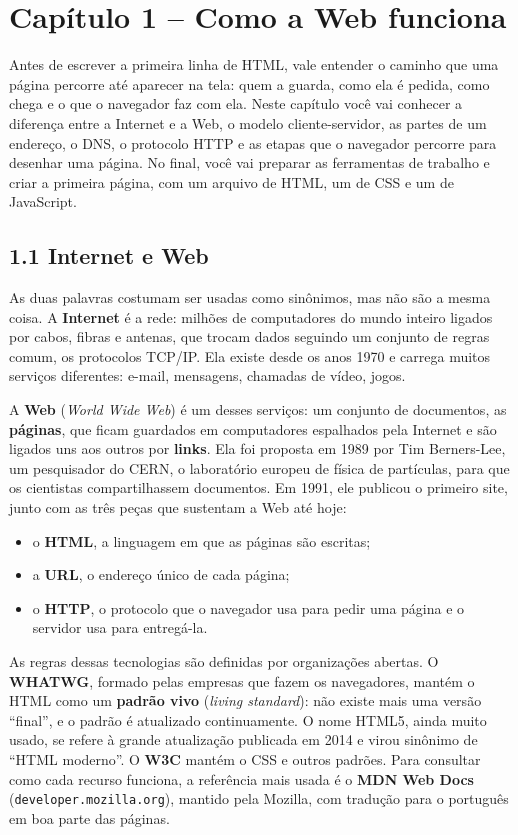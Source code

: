 \section{Capítulo 1 -- Como a Web funciona}

Antes de escrever a primeira linha de HTML, vale entender o caminho que uma página percorre até aparecer na tela: quem a guarda, como ela é pedida, como chega e o que o navegador faz com ela. Neste capítulo você vai conhecer a diferença entre a Internet e a Web, o modelo cliente-servidor, as partes de um endereço, o DNS, o protocolo HTTP e as etapas que o navegador percorre para desenhar uma página. No final, você vai preparar as ferramentas de trabalho e criar a primeira página, com um arquivo de HTML, um de CSS e um de JavaScript.

\subsection{1.1 Internet e Web}

As duas palavras costumam ser usadas como sinônimos, mas não são a mesma coisa. A \textbf{Internet} é a rede: milhões de computadores do mundo inteiro ligados por cabos, fibras e antenas, que trocam dados seguindo um conjunto de regras comum, os protocolos TCP/IP. Ela existe desde os anos 1970 e carrega muitos serviços diferentes: e-mail, mensagens, chamadas de vídeo, jogos.

A \textbf{Web} (\textit{World Wide Web}) é um desses serviços: um conjunto de documentos, as \textbf{páginas}, que ficam guardados em computadores espalhados pela Internet e são ligados uns aos outros por \textbf{links}. Ela foi proposta em 1989 por Tim Berners-Lee, um pesquisador do CERN, o laboratório europeu de física de partículas, para que os cientistas compartilhassem documentos. Em 1991, ele publicou o primeiro site, junto com as três peças que sustentam a Web até hoje:

\begin{itemize}
  \item o \textbf{HTML}, a linguagem em que as páginas são escritas;
  \item a \textbf{URL}, o endereço único de cada página;
  \item o \textbf{HTTP}, o protocolo que o navegador usa para pedir uma página e o servidor usa para entregá-la.
\end{itemize}

As regras dessas tecnologias são definidas por organizações abertas. O \textbf{WHATWG}, formado pelas empresas que fazem os navegadores, mantém o HTML como um \textbf{padrão vivo} (\textit{living standard}): não existe mais uma versão ``final'', e o padrão é atualizado continuamente. O nome HTML5, ainda muito usado, se refere à grande atualização publicada em 2014 e virou sinônimo de ``HTML moderno''. O \textbf{W3C} mantém o CSS e outros padrões. Para consultar como cada recurso funciona, a referência mais usada é o \textbf{MDN Web Docs} (\texttt{developer.mozilla.org}), mantido pela Mozilla, com tradução para o português em boa parte das páginas.

